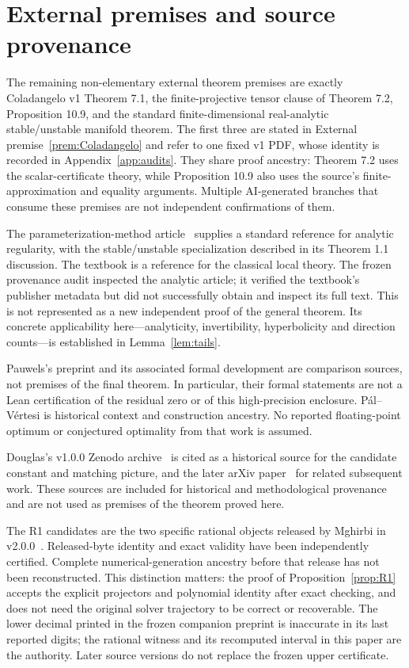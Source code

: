 \section{External premises and source provenance}\label{sec:provenance}
The remaining non-elementary external theorem premises are exactly
Coladangelo v1 Theorem 7.1, the finite-projective tensor clause of
Theorem 7.2, Proposition 10.9, and the standard finite-dimensional
real-analytic stable/unstable manifold theorem. The first three are stated
in External premise~\ref{prem:Coladangelo} and refer to one fixed v1 PDF,
whose identity is recorded in Appendix~\ref{app:audits}. They share proof
ancestry: Theorem 7.2 uses the scalar-certificate theory, while Proposition
10.9 also uses the source's finite-approximation and equality arguments.
Multiple AI-generated branches that consume these premises are not
independent confirmations of them.

The parameterization-method article~\cite{CabreFontichLlave2003} supplies
a standard reference for analytic regularity, with the stable/unstable
specialization described in its Theorem 1.1 discussion. The textbook
\cite{Shub1987} is a reference for the classical local theory. The frozen
provenance audit inspected the analytic article; it verified the textbook's
publisher metadata but did not successfully obtain and inspect its full
text. This is not represented as a new independent proof of the general
theorem. Its concrete applicability here---analyticity, invertibility,
hyperbolicity and direction counts---is established in
Lemma~\ref{lem:tails}.

Pauwels's preprint and its associated formal development are comparison
sources, not premises of the final theorem. In particular, their formal
statements are not a Lean certification of the residual zero or of this
high-precision enclosure. P\'al--V\'ertesi is historical context and
construction ancestry. No reported floating-point optimum or conjectured
optimality from that work is assumed.

Douglas's v1.0.0 Zenodo archive~\cite{Douglas2026Zenodo} is cited as a
historical source for the candidate constant and matching picture, and the
later arXiv paper~\cite{Douglas2026Arxiv} for related subsequent work. These
sources are included for historical and methodological provenance and are not
used as premises of the theorem proved here.

The R1 candidates are the two specific rational objects released by
Mghirbi in v2.0.0~\cite{Mghirbi2026data}. Released-byte identity and exact
validity have been independently certified. Complete numerical-generation
ancestry before that release has not been reconstructed. This distinction
matters: the proof of Proposition~\ref{prop:R1} accepts the explicit
projectors and polynomial identity after exact checking, and does not need
the original solver trajectory to be correct or recoverable. The lower
decimal printed in the frozen companion preprint is inaccurate in its last
reported digits; the rational witness and its recomputed interval in this
paper are the authority. Later source versions do not replace the frozen
upper certificate.


